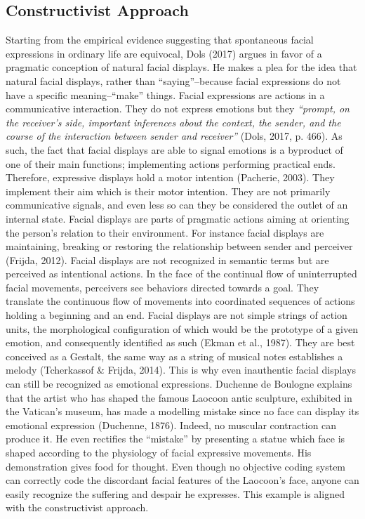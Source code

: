 \documentclass[
  english,
  doc]{apa7}
\begin{document}
\hypertarget{constructivist-approach}{%
\subsection{Constructivist Approach}\label{constructivist-approach}}

Starting from the empirical evidence suggesting that spontaneous facial expressions in ordinary life are equivocal, Dols (2017) argues in favor of a pragmatic conception of natural facial displays. He makes a plea for the idea that natural facial displays, rather than ``saying''--because facial expressions do not have a specific meaning--``make'' things. Facial expressions are actions in a communicative interaction. They do not express emotions but they \emph{``prompt, on the receiver's side, important inferences about the context, the sender, and the course of the interaction between sender and receiver''} (Dols, 2017, p. 466). As such, the fact that facial displays are able to signal emotions is a byproduct of one of their main functions; implementing actions performing practical ends. Therefore, expressive displays hold a motor intention (Pacherie, 2003). They implement their aim which is their motor intention. They are not primarily communicative signals, and even less so can they be considered the outlet of an internal state. Facial displays are parts of pragmatic actions aiming at orienting the person's relation to their environment. For instance facial displays are maintaining, breaking or restoring the relationship between sender and perceiver (Frijda, 2012). Facial displays are not recognized in semantic terms but are perceived as intentional actions. In the face of the continual flow of uninterrupted facial movements, perceivers see behaviors directed towards a goal. They translate the continuous flow of movements into coordinated sequences of actions holding a beginning and an end. Facial displays are not simple strings of action units, the morphological configuration of which would be the prototype of a given emotion, and consequently identified as such (Ekman et al., 1987). They are best conceived as a Gestalt, the same way as a string of musical notes establishes a melody (Tcherkassof \& Frijda, 2014). This is why even inauthentic facial displays can still be recognized as emotional expressions. Duchenne de Boulogne explains that the artist who has shaped the famous Laocoon antic sculpture, exhibited in the Vatican's museum, has made a modelling mistake since no face can display its emotional expression (Duchenne, 1876). Indeed, no muscular contraction can produce it. He even rectifies the ``mistake'' by presenting a statue which face is shaped according to the physiology of facial expressive movements. His demonstration gives food for thought. Even though no objective coding system can correctly code the discordant facial features of the Laocoon's face, anyone can easily recognize the suffering and despair he expresses. This example is aligned with the constructivist approach.
\end{document}
